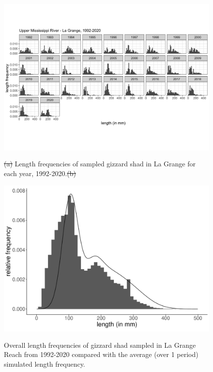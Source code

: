 \documentclass[preprint,review,12pt,authoryear]{elsarticle}
\providecommand{\DIFdeltex}[1]{{\protect\color{red}\sout{#1}}}                      %
\providecommand{\DIFaddbegin}{} %
\providecommand{\DIFdelFL}[1]{\DIFdel{#1}} %
\providecommand{\DIFaddbeginFL}{} %
\providecommand{\DIFaddendFL}{} %
\providecommand{\DIFdelbeginFL}{} %
\providecommand{\DIFdelendFL}{} %
\providecommand{\DIFdel}[1]{\texorpdfstring{\DIFdeltex{#1}}{}} %
\begin{document}
\begin{figure}
\centering
  \DIFdelbeginFL %
{%
}
\DIFdelendFL \DIFaddbeginFL \includegraphics[width=.8\textwidth]{figures/LTRMlg.png}
  \DIFaddendFL \label{fig:LTRMlg}
\DIFdelbeginFL %
\DIFdelendFL \caption{\DIFdelbeginFL %
\DIFdelFL{(a) }\DIFdelendFL Length frequencies of sampled gizzard shad in La Grange for each year, 1992-2020.\DIFdelbeginFL \DIFdelFL{(b) }\DIFdelendFL \DIFaddbeginFL }
\end{figure}    

\begin{figure}
\centering
  \includegraphics[width=.8\textwidth]{figures/lagrange.pdf}
\label{fig:lagrange}
\caption{\DIFaddendFL Overall length frequencies of gizzard shad sampled in La Grange Reach from 1992-2020 compared with the average (over 1 period) simulated length frequency.}
\end{figure}    
\DIFaddbegin 
\end{document}
